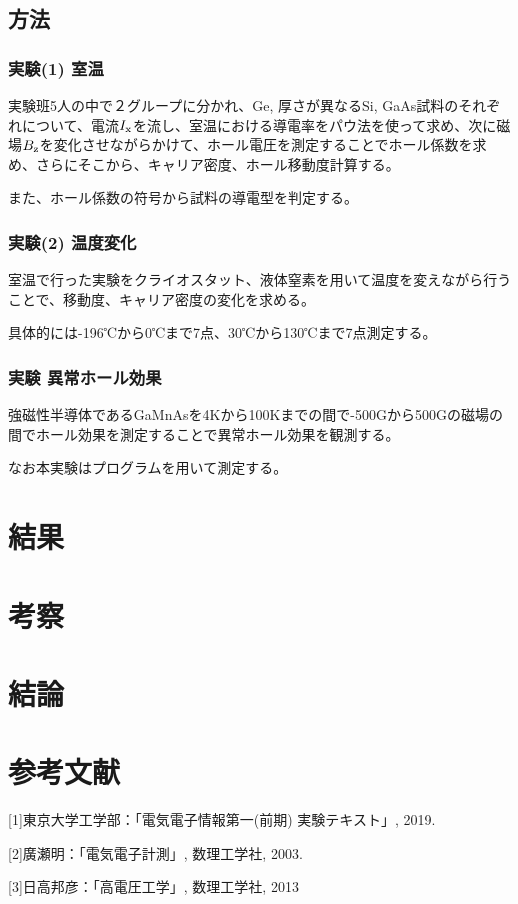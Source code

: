 \documentclass[dvipdfmx]{jsarticle}
\begin{document}
\subsection{方法}
\subsubsection{実験(1) 室温}
実験班5人の中で２グループに分かれ、Ge, 厚さが異なるSi, GaAs試料のそれぞれについて、電流$I_{\rm{x}}$を流し、室温における導電率をパウ法を使って求め、次に磁場$B_{\rm{z}}$を変化させながらかけて、ホール電圧を測定することでホール係数を求め、さらにそこから、キャリア密度、ホール移動度計算する。

また、ホール係数の符号から試料の導電型を判定する。


\subsubsection{実験(2) 温度変化}
室温で行った実験をクライオスタット、液体窒素を用いて温度を変えながら行うことで、移動度、キャリア密度の変化を求める。

具体的には-196℃から0℃まで7点、30℃から130℃まで7点測定する。


\subsubsection{実験 異常ホール効果}

強磁性半導体であるGaMnAsを4Kから100Kまでの間で-500Gから500Gの磁場の間でホール効果を測定することで異常ホール効果を観測する。

なお本実験はプログラムを用いて測定する。
\section{結果}

\section{考察}

\section{結論}



\section{参考文献}
[1]東京大学工学部：「電気電子情報第一(前期) 実験テキスト」, 2019.

[2]廣瀬明：「電気電子計測」, 数理工学社, 2003.

[3]日高邦彦：「高電圧工学」, 数理工学社, 2013
\end{document}
